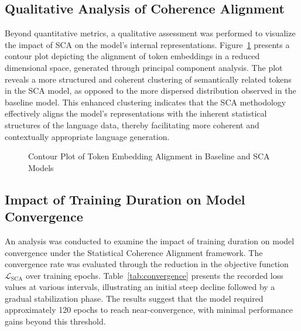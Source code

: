 \documentclass{article}
\begin{document}
\subsection{Qualitative Analysis of Coherence Alignment}

Beyond quantitative metrics, a qualitative assessment was performed to visualize the impact of SCA on the model's internal representations. Figure~\ref{fig:coherence_alignment} presents a contour plot depicting the alignment of token embeddings in a reduced dimensional space, generated through principal component analysis. The plot reveals a more structured and coherent clustering of semantically related tokens in the SCA model, as opposed to the more dispersed distribution observed in the baseline model. This enhanced clustering indicates that the SCA methodology effectively aligns the model's representations with the inherent statistical structures of the language data, thereby facilitating more coherent and contextually appropriate language generation.

\begin{figure}[h]
	\centering
	\caption{Contour Plot of Token Embedding Alignment in Baseline and SCA Models}
	\label{fig:coherence_alignment}
\end{figure}



\subsection{Impact of Training Duration on Model Convergence}

An analysis was conducted to examine the impact of training duration on model convergence under the Statistical Coherence Alignment framework. The convergence rate was evaluated through the reduction in the objective function \( \mathcal{L}_{\text{SCA}} \) over training epochs. Table~\ref{tab:convergence} presents the recorded loss values at various intervals, illustrating an initial steep decline followed by a gradual stabilization phase. The results suggest that the model required approximately 120 epochs to reach near-convergence, with minimal performance gains beyond this threshold.
\end{document}
